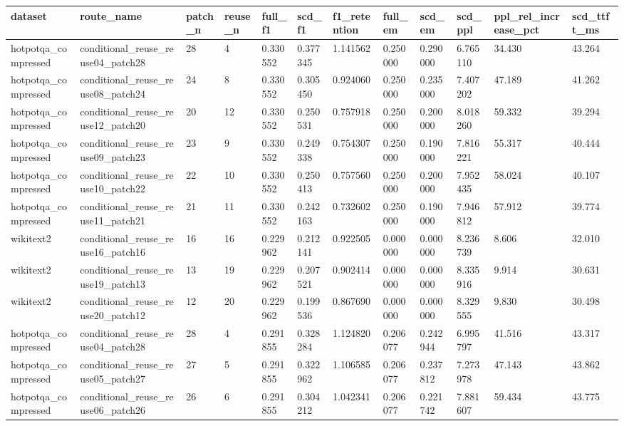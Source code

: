 \begin{tabular}{llllllllllll}
\toprule
dataset & route\_name & patch\_n & reuse\_n & full\_f1 & scd\_f1 & f1\_retention & full\_em & scd\_em & scd\_ppl & ppl\_rel\_increase\_pct & scd\_ttft\_ms \\
\midrule
hotpotqa\_compressed & conditional\_reuse\_reuse04\_patch28 & 28 & 4 & 0.330552 & 0.377345 & 1.141562 & 0.250000 & 0.290000 & 6.765110 & 34.430 & 43.264 \\
hotpotqa\_compressed & conditional\_reuse\_reuse08\_patch24 & 24 & 8 & 0.330552 & 0.305450 & 0.924060 & 0.250000 & 0.235000 & 7.407202 & 47.189 & 41.262 \\
hotpotqa\_compressed & conditional\_reuse\_reuse12\_patch20 & 20 & 12 & 0.330552 & 0.250531 & 0.757918 & 0.250000 & 0.200000 & 8.018260 & 59.332 & 39.294 \\
hotpotqa\_compressed & conditional\_reuse\_reuse09\_patch23 & 23 & 9 & 0.330552 & 0.249338 & 0.754307 & 0.250000 & 0.190000 & 7.816221 & 55.317 & 40.444 \\
hotpotqa\_compressed & conditional\_reuse\_reuse10\_patch22 & 22 & 10 & 0.330552 & 0.250413 & 0.757560 & 0.250000 & 0.200000 & 7.952435 & 58.024 & 40.107 \\
hotpotqa\_compressed & conditional\_reuse\_reuse11\_patch21 & 21 & 11 & 0.330552 & 0.242163 & 0.732602 & 0.250000 & 0.190000 & 7.946812 & 57.912 & 39.774 \\
wikitext2 & conditional\_reuse\_reuse16\_patch16 & 16 & 16 & 0.229962 & 0.212141 & 0.922505 & 0.000000 & 0.000000 & 8.236739 & 8.606 & 32.010 \\
wikitext2 & conditional\_reuse\_reuse19\_patch13 & 13 & 19 & 0.229962 & 0.207521 & 0.902414 & 0.000000 & 0.000000 & 8.335916 & 9.914 & 30.631 \\
wikitext2 & conditional\_reuse\_reuse20\_patch12 & 12 & 20 & 0.229962 & 0.199536 & 0.867690 & 0.000000 & 0.000000 & 8.329555 & 9.830 & 30.498 \\
hotpotqa\_compressed & conditional\_reuse\_reuse04\_patch28 & 28 & 4 & 0.291855 & 0.328284 & 1.124820 & 0.206077 & 0.242944 & 6.995797 & 41.516 & 43.317 \\
hotpotqa\_compressed & conditional\_reuse\_reuse05\_patch27 & 27 & 5 & 0.291855 & 0.322962 & 1.106585 & 0.206077 & 0.237812 & 7.273978 & 47.143 & 43.862 \\
hotpotqa\_compressed & conditional\_reuse\_reuse06\_patch26 & 26 & 6 & 0.291855 & 0.304212 & 1.042341 & 0.206077 & 0.221742 & 7.881607 & 59.434 & 43.775 \\

\end{tabular}
